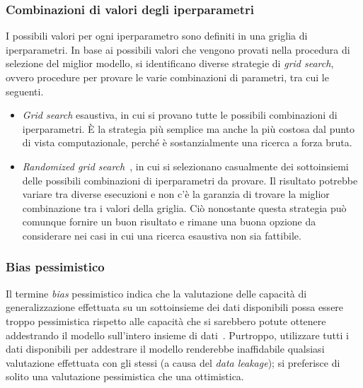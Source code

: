 \subsubsection{Combinazioni di valori degli iperparametri}
I possibili valori per ogni iperparametro sono definiti in una griglia di iperparametri.
In base ai possibili valori che vengono provati nella procedura di selezione del miglior modello, si identificano diverse strategie di \emph{grid search}, ovvero procedure per provare le varie combinazioni di parametri, tra cui le seguenti.
\begin{itemize}
    \item \emph{Grid search} esaustiva, in cui si provano tutte le possibili combinazioni di iperparametri. \`E la strategia più semplice ma anche la più costosa dal punto di vista computazionale, perché è sostanzialmente una ricerca a forza bruta.
    \item \emph{Randomized grid search}~\cite{random_grid_search}, in cui si selezionano casualmente dei sottoinsiemi delle possibili combinazioni di iperparametri da provare. Il risultato potrebbe variare tra diverse esecuzioni e non c'è la garanzia di trovare la miglior combinazione tra i valori della griglia.
    Ciò nonostante questa strategia può comunque fornire un buon risultato e rimane una buona opzione da considerare nei casi in cui una ricerca esaustiva non sia fattibile. 
\end{itemize}


\subsubsection{Bias pessimistico} Il termine \emph{bias} pessimistico indica che la valutazione delle capacità di generalizzazione effettuata su un sottoinsieme dei dati disponibili possa essere troppo pessimistica rispetto alle capacità che si sarebbero potute ottenere addestrando il modello sull'intero insieme di dati~\cite{model_evaluation}.
Purtroppo, utilizzare tutti i dati disponibili per addestrare il modello renderebbe inaffidabile qualsiasi valutazione effettuata con gli stessi (a causa del \emph{data leakage}); si preferisce di solito una valutazione pessimistica che una ottimistica.


